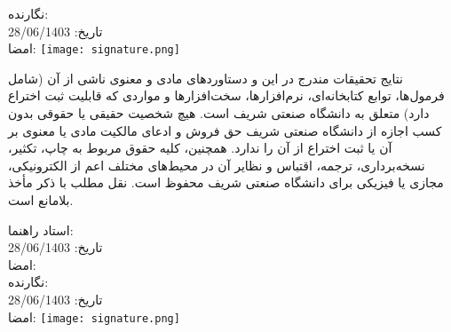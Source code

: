 {\begin{multicols}{2}
نگارنده: \ThesisAuthor\\
تاریخ: 28/06/1403\\
امضا: \texttt{[image: signature.png]} \\
\end{multicols}

نتایج تحقیقات مندرج در این \ThesisType{} و دستاوردهای مادی و معنوی ناشی از آن (شامل فرمول‌ها، توابع کتابخانه‌ای، نرم‌افزارها، سخت‌افزارها و مواردی که قابلیت ثبت اختراع دارد) متعلق به دانشگاه صنعتی شریف است. هیچ شخصیت حقیقی یا حقوقی بدون کسب اجازه از دانشگاه صنعتی شریف حق فروش و ادعای مالکیت مادی یا معنوی بر آن یا ثبت اختراع از آن را ندارد. همچنین، کلیه حقوق مربوط به چاپ، تکثیر، نسخه‌برداری، ترجمه، اقتباس و نظایر آن در محیط‌های مختلف اعم از الکترونیکی، مجازی یا فیزیکی برای دانشگاه صنعتی شریف محفوظ است. نقل مطلب با ذکر مأخذ بلامانع است.


\begin{multicols}{2}
استاد راهنما: \ThesisSupervisor \\
تاریخ: 28/06/1403\\
امضا: \\

نگارنده: \ThesisAuthor\\
تاریخ: 28/06/1403\\
امضا: \texttt{[image: signature.png]} \\
\end{multicols}
}

